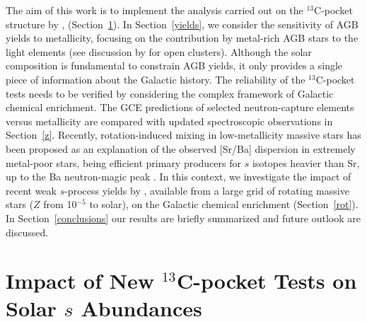 \documentclass[manuscript]{aastex}
\begin{document}
The aim of this work is to implement the analysis carried out on the 
$^{13}$C-pocket structure by \citet{bisterzo14}, (Section~\ref{tests}).
In Section~\ref{yields}, we consider the sensitivity of AGB yields 
to metallicity, focusing on the
contribution by metal-rich AGB stars to the 
light elements (see discussion by \citealt{maiorca12} for open
clusters). 
Although the solar composition is fundamental to constrain AGB yields, it
only provides a single piece of information about the Galactic history. 
The reliability of the $^{13}$C-pocket tests needs to be verified by 
considering the complex framework of Galactic chemical enrichment.
The GCE predictions of selected neutron-capture elements versus metallicity 
are compared with updated spectroscopic observations in Section~\ref{z}.
Recently, rotation-induced mixing in low-metallicity massive stars
has been proposed as an explanation of the observed [Sr/Ba] 
dispersion in extremely metal-poor stars, being efficient primary producers for 
$s$ isotopes heavier than Sr, up to the Ba neutron-magic peak
\citep{fris12,pignatari13,cescutti13}.
In this context, we investigate the impact of recent weak $s$-process
yields by \citet{fris16}, available from a large grid of rotating massive stars 
($Z$ from 10$^{-5}$ to solar), on the Galactic chemical enrichment (Section~\ref{rot}).
\\
In Section~\ref{conclusions} our results are briefly summarized and future outlook 
are discussed.







 
\section{Impact of New $^{13}$C-pocket Tests on Solar $s$ Abundances}\label{tests}
\end{document}

